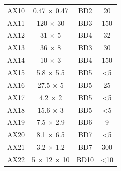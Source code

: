\begin{table}[h!]
\begin{tabular}{cccc}
AX10               & 0.47 $\times$ 0.47           & BD2                   & 20                                                                                                           \\ 
AX11               & 120 $\times$ 30              & BD3                   & 150                                                                                                          \\ 
AX12               & 31 $\times$ 5                & BD4                   & 32                                                                                                           \\ 
AX13               & 36 $\times$ 8                & BD3                   & 30                                                                                                           \\
AX14               & 10 $\times$ 3                & BD4                   & 150                                                                                                          \\ 
AX15               & 5.8 $\times$ 5.5             & BD5                   & \textless{}5                                                                                                 \\ 
AX16               & 27.5 $\times$ 5              & BD5                   & 25                                                                                                           \\
AX17               & 4.2 $\times$ 2               & BD5                   & \textless{}5                                                                                                 \\
AX18               & 15.6 $\times$ 3              & BD5                   & \textless{}5                                                                                                 \\ 
AX19               & 7.5 $\times$ 2.9             & BD6                   & 9                                                                                                            \\
AX20               & 8.1 $\times$ 6.5             & BD7                   & \textless{}5                                                                                                 \\
AX21               & 3.2 $\times$ 1.2             & BD7                   & 300                                                                                                          \\ 
AX22               & 5 $\times$ 12 $\times$ 10           & BD10                  & \textless{}10                                                                                                \\ \hline
\end{tabular}
\label{tab:xenolith_dimensions}
\end{table}

